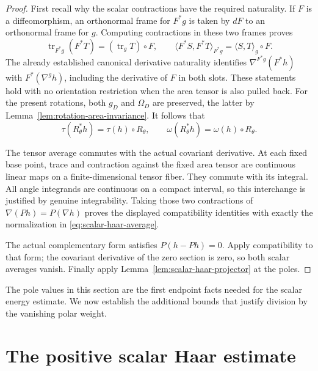\documentclass[11pt]{article}
\begin{document}
\begin{proof}
First recall why the scalar contractions have the required naturality. If $F$
is a diffeomorphism, an orthonormal frame for $F^*g$ is taken by $dF$ to an
orthonormal frame for $g$. Computing contractions in these two frames proves
\[
 \operatorname{tr}_{F^*g}(F^*T)=(\operatorname{tr}_gT)\circ F,
 \qquad
 \langle F^*S,F^*T\rangle_{F^*g}=\langle S,T\rangle_g\circ F.
\]
The already established canonical derivative naturality identifies
$\nabla^{F^*g}(F^*h)$ with $F^*(\nabla^g h)$, including the derivative of $F$
in both slots. These statements hold with no orientation restriction when the
area tensor is also pulled back. For the present rotations, both $g_D$ and
$\Omega_D$ are preserved, the latter by Lemma~\ref{lem:rotation-area-invariance}.
It follows that
\[
 \tau(R_\theta^*h)=\tau(h)\circ R_\theta,
 \qquad \omega(R_\theta^*h)=\omega(h)\circ R_\theta.
\]

The tensor average commutes with the actual covariant derivative. At each
fixed base point, trace and contraction against the fixed area tensor are
continuous linear maps on a finite-dimensional tensor fiber. They commute
with its integral. All angle integrands are continuous on a compact interval,
so this interchange is justified by genuine integrability. Taking those two
contractions of $\nabla(Ph)=P(\nabla h)$ proves the displayed compatibility
identities with exactly the normalization in \eqref{eq:scalar-haar-average}.

The actual complementary form satisfies $P(h-Ph)=0$. Apply compatibility to
that form; the covariant derivative of the zero section is zero, so both scalar
averages vanish. Finally apply Lemma~\ref{lem:scalar-haar-projector} at the poles.
\end{proof}

The pole values in this section are the first endpoint facts needed for
the scalar energy estimate. We now establish the additional bounds that justify
division by the vanishing polar weight.

\section{The positive scalar Haar estimate}
\end{document}
